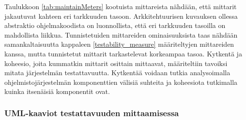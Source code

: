 \documentclass[finnish]{tktltiki2}
\numberwithin{table}{section}
\theoremstyle{definition}
\theoremstyle{remark}
\begin{document}
\begin{table}[H]
	\centering
	\setlength{\extrarowheight}{4pt}%
\end{table}

\newpage

\noindent
Taulukkoon \ref{tab:maintainMeters} kootuista mittareista nähdään, että mittarit jakautuvat kahteen eri tarkkuuden tasoon. Arkkitehtuurisen kuvauksen ollessa abstraktio ohjelmakoodista on luonnollista, että eri tarkkuuden tasoilla on mahdollista liikkua. Tunnistetuiden mittareiden ominaisuuksista taas nähdään samankaltaisuutta kappaleen \ref{testability_measure} määriteltyjen mittareiden kanssa, mutta tunnistetut mittarit tarkastelevat korkeampaa tasoa. Kytkentä ja koheesio, joita kummatkin mittarit osittain mittaavat,  määriteltiin tavoiksi mitata järjestelmän testattavuutta. Kytkentää voidaan tutkia analysoimalla ohjelmistojärjestelmän komponenttien välisiä suhteita ja koheesiota tutkimalla kuinka itsenäisiä komponentit ovat.

\subsubsection{UML-kaaviot testattavuuden mittaamisessa} \label{uml_arch_test}
\end{document}
